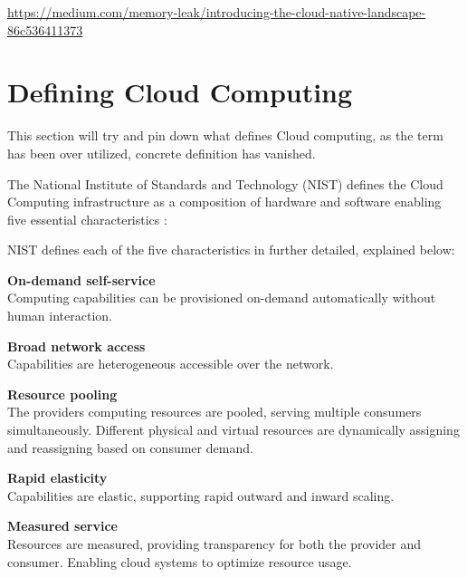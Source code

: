 \url{https://medium.com/memory-leak/introducing-the-cloud-native-landscape-86c536411373}

\section{Defining Cloud Computing}
This section will try and pin down what defines Cloud computing, as the term has been over utilized, concrete definition has vanished.

The National Institute of Standards and Technology (NIST) defines the Cloud Computing infrastructure as a composition of hardware and software enabling five essential characteristics \cite{mell2011nist}:


NIST defines each of the five characteristics in further detailed, explained below:

\textbf{On-demand self-service}\\
Computing capabilities can be provisioned on-demand automatically without human interaction.

\textbf{Broad network access}\\
Capabilities are heterogeneous accessible over the network.

\textbf{Resource pooling}\\
The providers computing resources are pooled, serving multiple consumers simultaneously. Different physical and virtual resources are dynamically assigning and reassigning based on consumer demand.

\textbf{Rapid elasticity}\\
Capabilities are elastic, supporting rapid outward and inward scaling. 

\textbf{Measured service}\\
Resources are measured, providing transparency for both the provider and consumer. Enabling cloud systems to optimize resource usage.


